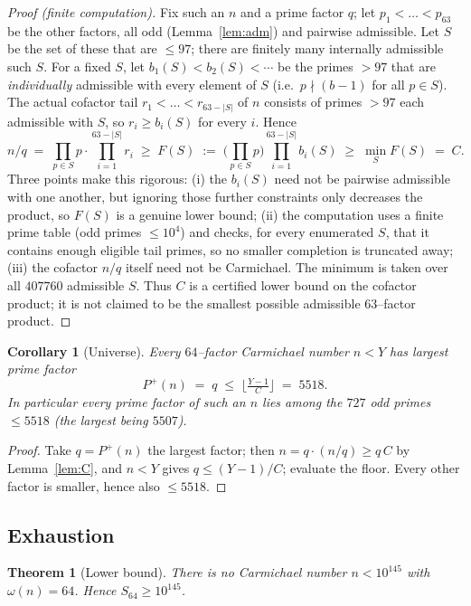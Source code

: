 \documentclass[11pt]{article}
\newtheorem{theorem}{Theorem}
\newtheorem{corollary}{Corollary}
\theoremstyle{definition}
\newcommand{\Smin}{S_{64}}
\newcommand{\Pp}{P^{+}}
\begin{document}
\begin{proof}[Proof (finite computation)]
Fix such an $n$ and a prime factor $q$; let $p_1<\dots<p_{63}$ be the other factors, all odd
(Lemma~\ref{lem:adm}) and pairwise admissible. Let $S$ be the set of these that are $\le 97$; there
are finitely many internally admissible such $S$. For a fixed $S$, let $b_1(S)<b_2(S)<\cdots$ be the
primes $>97$ that are \emph{individually} admissible with every element of $S$ (i.e.\ $p\nmid(b-1)$
for all $p\in S$). The actual cofactor tail $r_1<\dots<r_{63-|S|}$ of $n$ consists of primes $>97$
each admissible with $S$, so $r_i\ge b_i(S)$ for every $i$. Hence
\[
  n/q \;=\; \prod_{p\in S}p \cdot \prod_{i=1}^{63-|S|} r_i
  \;\ge\; F(S) \;:=\; \Big(\prod_{p\in S}p\Big)\prod_{i=1}^{63-|S|} b_i(S)
  \;\ge\; \min_{S} F(S) \;=\; C.
\]
Three points make this rigorous: (i) the $b_i(S)$ need not be pairwise admissible with one another,
but ignoring those further constraints only decreases the product, so $F(S)$ is a genuine lower
bound; (ii) the computation uses a finite prime table (odd primes $\le 10^4$) and checks, for every
enumerated $S$, that it contains enough eligible tail primes, so no smaller completion is truncated
away; (iii) the cofactor $n/q$ itself need not be Carmichael. The minimum is taken over all
$407760$ admissible $S$. Thus $C$ is a certified lower bound on the cofactor product; it is not
claimed to be the smallest possible admissible $63$--factor product.
\end{proof}

\begin{corollary}[Universe]\label{cor:univ}
Every $64$--factor Carmichael number $n<Y$ has largest prime factor
\[
  \Pp(n)\;=\;q\;\le\;\Big\lfloor \tfrac{Y-1}{C}\Big\rfloor \;=\; 5518 .
\]
In particular every prime factor of such an $n$ lies among the $727$ odd primes $\le 5518$ (the
largest being $5507$).
\end{corollary}

\begin{proof}
Take $q=\Pp(n)$ the largest factor; then $n=q\cdot(n/q)\ge q\,C$ by Lemma~\ref{lem:C}, and $n<Y$
gives $q\le(Y-1)/C$; evaluate the floor. Every other factor is smaller, hence also $\le 5518$.
\end{proof}

\subsection{Exhaustion}

\begin{theorem}[Lower bound]\label{thm:lower}
There is no Carmichael number $n<10^{145}$ with $\omega(n)=64$. Hence $\Smin\ge 10^{145}$.
\end{theorem}
\end{document}
